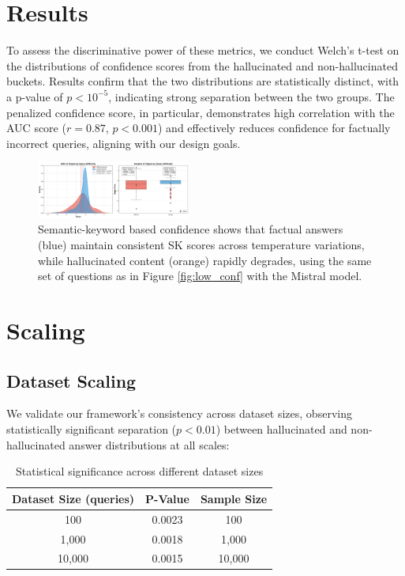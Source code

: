 \documentclass[sigconf]{acmart}
\begin{document}
\section{Results}

To assess the discriminative power of these metrics, we conduct Welch's t-test on the distributions of confidence scores from the hallucinated and non-hallucinated buckets. Results confirm that the two distributions are statistically distinct, with a p-value of $p < 10^{-5}$, indicating strong separation between the two groups. The penalized confidence score, in particular, demonstrates high correlation with the AUC score ($r = 0.87$, $p < 0.001$) and effectively reduces confidence for factually incorrect queries, aligning with our design goals.

\begin{figure}[ht]
    \centering
    \includegraphics[width=0.45\textwidth]{images/slope_SK_scores.png}
    \caption{Semantic-keyword based confidence shows that factual answers (blue) maintain consistent SK scores across temperature variations, while hallucinated content (orange) rapidly degrades, using the same set of questions as in Figure \ref{fig:low_conf} with the Mistral model.}
    \label{fig:sk_confidence}
\end{figure}


\section{Scaling}

\subsection{Dataset Scaling}
We validate our framework's consistency across dataset sizes, observing statistically significant separation ($p < 0.01$) between hallucinated and non-hallucinated answer distributions at all scales:

\begin{table}[h]
\centering
\begin{tabular}{ccc}
\hline
\textbf{Dataset Size (queries)} & \textbf{P-Value} & \textbf{Sample Size} \\
\hline
100 & 0.0023 & 100 \\
1,000 & 0.0018 & 1,000 \\
10,000 & 0.0015 & 10,000 \\
\hline
\end{tabular}
\caption{Statistical significance across different dataset sizes}
\end{table}
\end{document}
